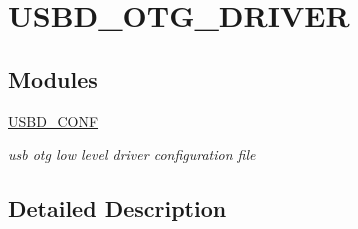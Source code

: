 \hypertarget{group___u_s_b_d___o_t_g___d_r_i_v_e_r}{}\section{U\+S\+B\+D\+\_\+\+O\+T\+G\+\_\+\+D\+R\+I\+V\+ER}
\label{group___u_s_b_d___o_t_g___d_r_i_v_e_r}
\subsection*{Modules}
\begin{DoxyCompactItemize}
\item 
\mbox{\hyperlink{group___u_s_b_d___c_o_n_f}{U\+S\+B\+D\+\_\+\+C\+O\+NF}}
\begin{DoxyCompactList}\small\item\em usb otg low level driver configuration file \end{DoxyCompactList}\end{DoxyCompactItemize}


\subsection{Detailed Description}
